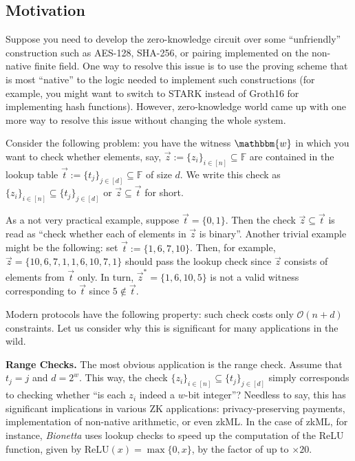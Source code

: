 \subsection{Motivation}

Suppose you need to develop the zero-knowledge circuit over some ``unfriendly''
construction such as AES-128, SHA-256, or pairing implemented on the non-native
finite field. One way to resolve this issue is to use the proving scheme that is
most ``native'' to the logic needed to implement such constructions (for
example, you might want to switch to STARK instead of Groth16 for implementing
hash functions). However, zero-knowledge world came up with one more way to
resolve this issue without changing the whole system.

Consider the following problem: you have the witness $\mathbbm{w}$ in which you
want to check whether elements, say, $\vec{z} := \{z_i\}_{i \in [n]} \subseteq
\mathbb{F}$ are contained in the lookup table $\vec{t} := \{t_j\}_{j \in [d]}
\subseteq \mathbb{F}$ of size $d$. We write this check as $\{z_i\}_{i \in [n]}
\subseteq \{t_j\}_{j \in [d]}$ or $\vec{z} \subseteq \vec{t}$ for short.

\begin{example}
    As a not very practical example, suppose $\vec{t} = \{0,1\}$. Then the check
    $\vec{z} \subseteq \vec{t}$ is read as ``check whether each of elements in
    $\vec{z}$ is binary''. Another trivial example might be the following: set
    $\vec{t} := \{1,6,7,10\}$. Then, for example, $\vec{z} =
    \{10,6,7,1,1,6,10,7,1\}$ should pass the lookup check since $\vec{z}$
    consists of elements from $\vec{t}$ only. In turn, $\vec{z}^*=\{1,6,10,5\}$
    is not a valid witness corresponding to $\vec{t}$ since $5 \not\in \vec{t}$.
\end{example}

Modern protocols have the following property: such check costs only
$\mathcal{O}(n+d)$ constraints. Let us consider why this is significant for many
applications in the wild.

\textbf{Range Checks.} The most obvious application is the range check. Assume
that $t_j=j$ and $d=2^w$. This way, the check $\{z_i\}_{i \in [n]} \subseteq
\{t_j\}_{j \in [d]}$ simply corresponds to checking whether ``is each $z_i$
indeed a $w$-bit integer''? Needless to say, this has significant implications
in various ZK applications: privacy-preserving payments, implementation of
non-native arithmetic, or even zkML. In the case of zkML, for instance,
\textit{Bionetta} uses lookup checks to speed up the computation of the ReLU
function, given by $\text{ReLU}(x) = \max\{0,x\}$, by the factor of up to
$\times 20$.

